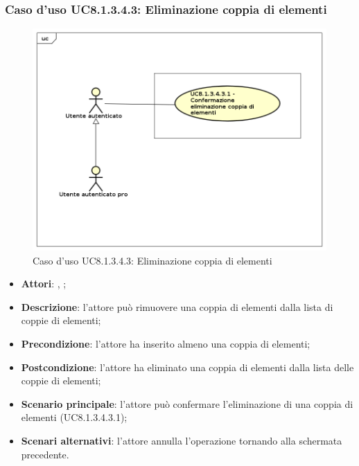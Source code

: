 	\subsubsection{Caso d'uso UC8.1.3.4.3: Eliminazione coppia di elementi}
	\label{UC8.1.3.4.3}
	\begin{figure}[h]
		\centering
		\includegraphics[scale=0.5,keepaspectratio]{UML/UC8_1_3_4_3.png}
		\caption{Caso d'uso UC8.1.3.4.3: Eliminazione coppia di elementi}
	\end{figure}
	\FloatBarrier
	\begin{itemize}
		\item \textbf{Attori}: \uau, \uaupro;
		\item \textbf{Descrizione}: l'attore può rimuovere una coppia di elementi dalla lista di coppie di elementi;
		\item \textbf{Precondizione}: l'attore ha inserito almeno una coppia di elementi;
		\item \textbf{Postcondizione}: l'attore ha eliminato una coppia di elementi dalla lista delle coppie di elementi;
		\item \textbf{Scenario principale}: l'attore può confermare l'eliminazione di una coppia di elementi (UC8.1.3.4.3.1);	
		\item \textbf{Scenari alternativi}: l'attore annulla l'operazione tornando alla schermata precedente.
	\end{itemize}

